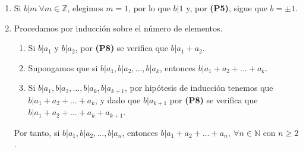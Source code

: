 \documentclass[11pt]{article}
\newcommand{\N}{\mathbb{N}}
\newcommand{\Z}{\mathbb{Z}}
\begin{document}
\begin{enumerate}[start=2]
  \item Si $b|m \ \forall m\in\Z$, elegimos $m=1$, por lo que $b|1$ y, por \textbf{(P5)}, sigue que $b= \pm 1$.
  \item Procedamos por inducción sobre el número de elementos.
    \begin{enumerate}[label=\roman*)]
      \item Si $b|a_1$ y $b|a_2$, por \textbf{(P8)} se verifica que $b|a_1+a_2$.
      \item Supongamos que si $b|a_1, b|a_2, \dots , b|a_k$, entonces $b|a_1+a_2+\ldots+a_k$.
      \item Si $b|a_1,b|a_2,\dots,b|a_k, b|a_{k+1}$, por hipótesis de inducción tenemos que $b|a_1+a_2+\ldots+a_k$, y dado que $b|a_{k+1}$ por \textbf{(P8)} se verifica que $b|a_1+a_2+\ldots+a_k+a_{k+1}$.
    \end{enumerate}
    Por tanto, si $b|a_1, b|a_2, \dots, b|a_n$, entonces $b|a_1+a_2+\dots +a_n, \ \forall n \in \N$ con $n \geq 2$.
\end{enumerate}
\end{document}

